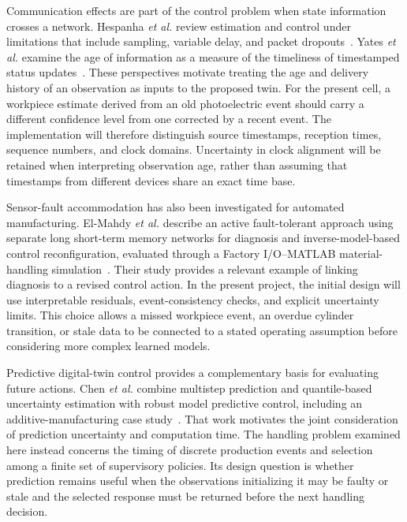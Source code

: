 Communication effects are part of the control problem when state information crosses a network. Hespanha \emph{et al.} review estimation and control under limitations that include sampling, variable delay, and packet dropouts~\cite{Hespanha2007}. Yates \emph{et al.} examine the age of information as a measure of the timeliness of timestamped status updates~\cite{Yates2021}. These perspectives motivate treating the age and delivery history of an observation as inputs to the proposed twin. For the present cell, a workpiece estimate derived from an old photoelectric event should carry a different confidence level from one corrected by a recent event. The implementation will therefore distinguish source timestamps, reception times, sequence numbers, and clock domains. Uncertainty in clock alignment will be retained when interpreting observation age, rather than assuming that timestamps from different devices share an exact time base.

Sensor-fault accommodation has also been investigated for automated manufacturing. El-Mahdy \emph{et al.} describe an active fault-tolerant approach using separate long short-term memory networks for diagnosis and inverse-model-based control reconfiguration, evaluated through a Factory I/O--MATLAB material-handling simulation~\cite{ElMahdy2024}. Their study provides a relevant example of linking diagnosis to a revised control action. In the present project, the initial design will use interpretable residuals, event-consistency checks, and explicit uncertainty limits. This choice allows a missed workpiece event, an overdue cylinder transition, or stale data to be connected to a stated operating assumption before considering more complex learned models.

Predictive digital-twin control provides a complementary basis for evaluating future actions. Chen \emph{et al.} combine multistep prediction and quantile-based uncertainty estimation with robust model predictive control, including an additive-manufacturing case study~\cite{Chen2026}. That work motivates the joint consideration of prediction uncertainty and computation time. The handling problem examined here instead concerns the timing of discrete production events and selection among a finite set of supervisory policies. Its design question is whether prediction remains useful when the observations initializing it may be faulty or stale and the selected response must be returned before the next handling decision.

